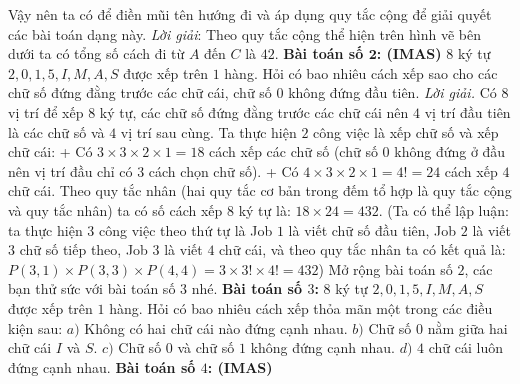 \begin{multicols}{2}
\begin{figure}[H]
	\vspace*{-10pt}
	\end{figure}
		Vậy nên ta có để điền mũi tên hướng đi và áp dụng quy tắc cộng để giải quyết các bài toán dạng này.
		\vskip 0.1cm
		\textit{Lời giải}: Theo quy tắc cộng thể hiện trên hình vẽ bên dưới ta có tổng số cách đi từ $A$ đến $C$ là $42$.
	\vskip 0.1cm
	\textbf{\color{toancuabi}Bài toán số $\pmb{2}$: (IMAS)}
	\vskip 0.1cm
	$8$ ký tự $2,0,1,5,I,M,A,S$ được xếp trên $1$ hàng. Hỏi có bao nhiêu cách xếp sao cho các chữ số đứng đằng trước các chữ cái, chữ số $0$ không đứng đầu tiên.
	\vskip 0.1cm
	\textit{Lời giải.}
	Có $8$ vị trí để xếp $8$ ký tự, các chữ số đứng đằng trước các chữ cái nên $4$ vị trí đầu tiên là các chữ số và $4$ vị trí sau cùng. Ta thực hiện $2$ công việc là xếp chữ số và xếp chữ cái:
	\vskip 0.1cm
	+ Có $3\times3\times2\times1=18$ cách xếp các chữ số (chữ số $0$ không đứng ở đầu nên vị trí đầu chỉ có $3$ cách chọn chữ số).
	\vskip 0.1cm
	+ Có $4\times3\times2\times1=4!=24$ cách xếp $4$ chữ cái.
	\vskip 0.1cm
	Theo quy tắc nhân (hai quy tắc cơ bản trong đếm tổ hợp là quy tắc cộng và quy tắc nhân) ta có số cách xếp $8$ ký tự là: $18\times24=432$.
	\vskip 0.1cm
	(Ta có thể lập luận: ta thực hiện $3$ công việc theo thứ tự là Job $1$ là viết chữ số đầu tiên, Job $2$ là viết $3$ chữ số tiếp theo, Job $3$ là viết $4$ chữ cái, và theo quy tắc nhân ta có kết quả là: $P(3,1)\times P(3,3)\times P(4,4)=3\times3!\times4!=432$)
	\vskip 0.1cm
	Mở rộng bài toán số $2$, các bạn thử sức với bài toán số $3$ nhé.
	\vskip 0.1cm
	\textbf{\color{toancuabi}Bài toán số $3$:}
	\vskip 0.1cm
	$8$ ký tự $2,0,1,5,I,M,A,S$ được xếp trên $1$ hàng. Hỏi có bao nhiêu cách xếp thỏa mãn một trong các điều kiện sau:
	\vskip 0.1cm
	$a)$ Không có hai chữ cái nào đứng cạnh nhau.
	\vskip 0.1cm
	$b)$ Chữ số $0$ nằm giữa hai chữ cái $I$ và $S$.
	\vskip 0.1cm
	$c)$ Chữ số $0$ và chữ số $1$ không đứng cạnh nhau.
	\vskip 0.1cm
	$d)$ $4$ chữ cái luôn đứng cạnh nhau.
	\vskip 0.1cm
	\textbf{\color{toancuabi}Bài toán số $4$: (IMAS)}

\end{multicols}
